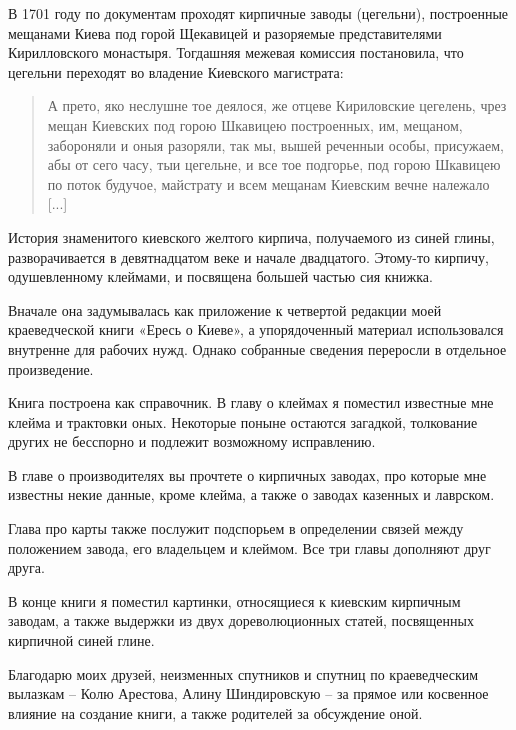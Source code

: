 В 1701 году по документам проходят кирпичные заводы (цегельни), построенные мещанами Киева под горой Щекавицей и разоряемые представителями Кирилловского монастыря. Тогдашняя межевая комиссия постановила, что цегельни переходят во владение Киевского магистрата\cite[том 2, стр. 22]{akty}:

\begin{quotation}
А прето, яко неслушне тое деялося, же отцеве Кириловские цегелень, чрез мещан Киевских под горою Шкавицею построенных, им, мещаном, забороняли и оныя разоряли, так мы, вышей реченныи особы, присужаем, абы от сего часу, тыи цегельне, и все тое подгорье, под горою Шкавицею по поток будучое, майстрату и всем мещанам Киевским вечне належало [...]
\end{quotation}



История знаменитого киевского желтого кирпича, получаемого из синей глины, разворачивается в девятнадцатом веке и начале двадцатого. Этому-то кирпичу, одушевленному клеймами, и посвящена большей частью сия книжка.

Вначале она задумывалась как приложение к четвертой редакции моей краеведческой книги «Ересь о Киеве», а упорядоченный материал использовался внутренне для рабочих нужд. Однако собранные сведения переросли в отдельное произведение.

Книга построена как справочник. В главу о клеймах я поместил известные мне клейма и трактовки оных. Некоторые поныне остаются загадкой, толкование других не бесспорно и подлежит возможному исправлению.

В главе о производителях вы прочтете о кирпичных заводах, про которые мне известны некие данные, кроме клейма, а также о заводах казенных и лаврском. 

Глава про карты также послужит подспорьем в определении связей между положением завода, его владельцем и клеймом. Все три главы дополняют друг друга.

В конце книги я поместил картинки, относящиеся к киевским кирпичным заводам, а также выдержки из двух дореволюционных статей, посвященных кирпичной синей глине.

Благодарю моих друзей, неизменных спутников и спутниц по краеведческим вылазкам – Колю Арестова, Алину Шиндировскую – за прямое или косвенное влияние на создание книги, а также родителей за обсуждение оной.

